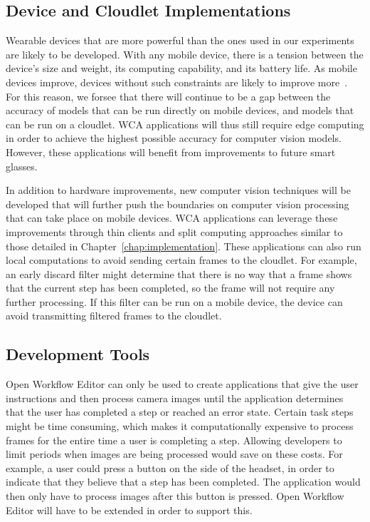 \subsection{Device and Cloudlet Implementations}

Wearable devices that are more powerful than the ones used in our experiments
are likely to be developed.
With any mobile device, there is a tension between the device's size and
weight, its computing capability, and its battery life.
As mobile devices improve, devices without such constraints are likely to
improve more~\cite{Satya2021}.
For this reason, we forsee that there will continue to be a gap between the
accuracy of models that can be run directly on mobile devices, and models that
can be run on a cloudlet.
WCA applications will thus still require edge computing in order to achieve the
highest possible accuracy for computer vision models.
However, these applications will benefit from improvements to future smart
glasses.

In addition to hardware improvements, new computer vision techniques will be
developed that will further push the boundaries on computer vision processing
that can take place on mobile devices.
WCA applications can leverage these improvements through thin clients and split
computing approaches similar to those detailed in
Chapter~\ref{chap:implementation}.
These applications can also run local computations to avoid sending certain
frames to the cloudlet.
For example, an early discard filter might determine that there is no way that a
frame shows that the current step has been completed, so the frame will not
require any further processing.
If this filter can be run on a mobile device, the device can avoid transmitting
filtered frames to the cloudlet.

\subsection{Development Tools}

Open Workflow Editor can only be used to create applications that give the user
instructions and then process camera images until the application determines
that the user has completed a step or reached an error state.
Certain task steps might be time consuming, which makes it computationally
expensive to process frames for the entire time a user is completing a step.
Allowing developers to limit periods when images are being processed would save
on these costs.
For example, a user could press a button on the side of the headset, in order to
indicate that they believe that a step has been completed.
The application would then only have to process images after this button is
pressed.
Open Workflow Editor will have to be extended in order to support this.

